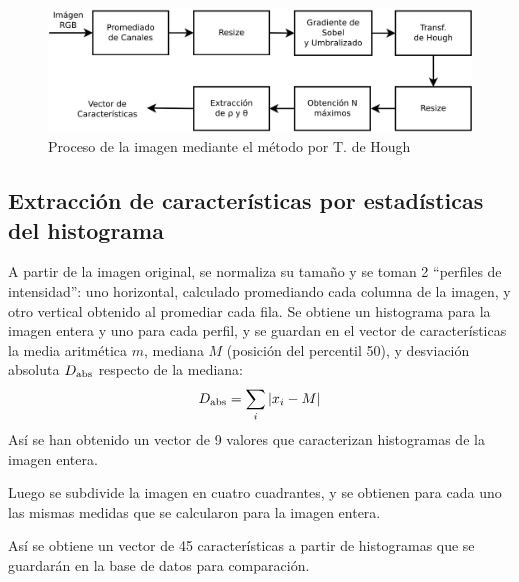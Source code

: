 \documentclass[conference,spanish,a4paper,10pt,oneside,final]{tfmpd}
\begin{document}
%

%
%
\begin{figure}
\begin{center}
\includegraphics[scale=0.25]{../diagramas/procesohough} 
\end{center}
\caption{Proceso de la imagen mediante el método por T. de Hough}
\label{procesohough}
\end{figure}
%
%
\subsection*{Extracción de características por estadísticas del histograma}
A partir de la imagen original, se normaliza su tamaño y se toman 2 ``perfiles de
intensidad'': uno horizontal, calculado promediando cada columna de la imagen, y
otro vertical obtenido al promediar cada fila. Se obtiene un histograma para la
imagen entera y uno para cada perfil, y se guardan en el vector de
características la media aritmética $m$, mediana $M$ (posición del percentil 50),
 y desviación absoluta $D_{\textrm{abs}}$ respecto de la mediana:
\begin{equation*}
D_{\textrm{abs}}=\sum_i |x_i - M|
\end{equation*}
Así se han obtenido un vector de 9 valores que caracterizan histogramas de la
imagen entera.

Luego se subdivide la imagen en cuatro cuadrantes, y se obtienen para cada uno
las mismas medidas que se calcularon para la imagen entera.

Así se obtiene un vector de 45 características a partir de histogramas que se
guardarán en la base de datos para comparación.
\end{document}
